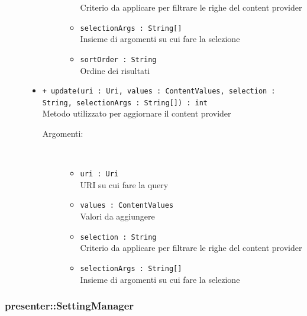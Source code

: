 \documentclass[../DefinizioneDiProdotto.tex]{subfiles}
\begin{document}
\begin{description}
\begin{itemize}
\begin{description}
\begin{itemize}
Criterio da applicare per filtrare le righe del content provider\item \texttt{selectionArgs : String[]}\\
Insieme di argomenti su cui fare la selezione\item \texttt{sortOrder : String}\\
Ordine dei risultati\end{itemize}
\end{description}
\item \texttt{+ update(uri : Uri, values : ContentValues, selection : String, selectionArgs : String[]) : int}\\
Metodo utilizzato per aggiornare il content provider
 \begin{description}
\item[Argomenti:] \
\begin{itemize}
\item \texttt{uri : Uri}\\
URI su cui fare la query\item \texttt{values : ContentValues}\\
Valori da aggiungere\item \texttt{selection : String}\\
Criterio da applicare per filtrare le righe del content provider\item \texttt{selectionArgs : String[]}\\
Insieme di argomenti su cui fare la selezione\end{itemize}
\end{description}
\end{itemize}
\end{description}

\subsubsection{presenter::SettingManager}
\end{document}
